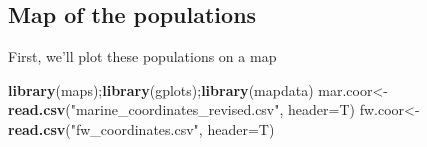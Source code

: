 \documentclass[11pt,]{article}
\newenvironment{Shaded}{\begin{snugshade}}{\end{snugshade}}
\newcommand{\KeywordTok}[1]{\textcolor[rgb]{0.13,0.29,0.53}{\textbf{#1}}}
\newcommand{\DataTypeTok}[1]{\textcolor[rgb]{0.13,0.29,0.53}{#1}}
\newcommand{\DecValTok}[1]{\textcolor[rgb]{0.00,0.00,0.81}{#1}}
\newcommand{\StringTok}[1]{\textcolor[rgb]{0.31,0.60,0.02}{#1}}
\newcommand{\OperatorTok}[1]{\textcolor[rgb]{0.81,0.36,0.00}{\textbf{#1}}}
\newcommand{\NormalTok}[1]{#1}
\begin{document}
\begin{Shaded}
\end{Shaded}

\subsection{Map of the populations}\label{map-of-the-populations}

First, we'll plot these populations on a map

\begin{Shaded}
\begin{Highlighting}[]
\KeywordTok{library}\NormalTok{(maps);}\KeywordTok{library}\NormalTok{(gplots);}\KeywordTok{library}\NormalTok{(mapdata)}
\NormalTok{mar.coor<-}\KeywordTok{read.csv}\NormalTok{(}\StringTok{"marine_coordinates_revised.csv"}\NormalTok{, }\DataTypeTok{header=}\NormalTok{T)}
\NormalTok{fw.coor<-}\KeywordTok{read.csv}\NormalTok{(}\StringTok{"fw_coordinates.csv"}\NormalTok{, }\DataTypeTok{header=}\NormalTok{T)}
\end{Highlighting}
\end{Shaded}
\end{document}
